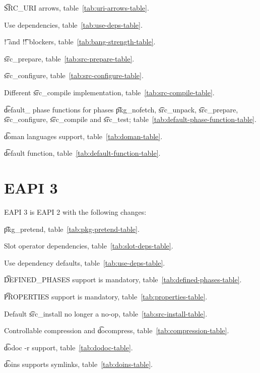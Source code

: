 \begin{compactitem}
\item \t{SRC\_URI} arrows, table~\ref{tab:uri-arrows-table}.
\item Use dependencies, table~\ref{tab:use-deps-table}.
\item \t{!} and \t{!!} blockers, table~\ref{tab:bang-strength-table}.
\item \t{src\_prepare}, table~\ref{tab:src-prepare-table}.
\item \t{src\_configure}, table~\ref{tab:src-configure-table}.
\item Different \t{src\_compile} implementation, table~\ref{tab:src-compile-table}.
\item \t{default\_} phase functions for phases \t{pkg\_nofetch}, \t{src\_unpack}, \t{src\_prepare},
    \t{src\_configure}, \t{src\_compile} and \t{src\_test}; table~\ref{tab:default-phase-function-table}.
\item \t{doman} languages support, table~\ref{tab:doman-table}.
\item \t{default} function, table~\ref{tab:default-function-table}.
\end{compactitem}

\section*{EAPI 3}

EAPI 3 is EAPI 2 with the following changes:

\begin{compactitem}
\item \t{pkg\_pretend}, table~\ref{tab:pkg-pretend-table}.
\item Slot operator dependencies, table~\ref{tab:slot-deps-table}.
\item Use dependency defaults, table~\ref{tab:use-deps-table}.
\item \t{DEFINED\_PHASES} support is mandatory, table~\ref{tab:defined-phases-table}.
\item \t{PROPERTIES} support is mandatory, table~\ref{tab:properties-table}.
\item Default \t{src\_install} no longer a no-op, table~\ref{tab:src-install-table}.
\item Controllable compression and \t{docompress}, table~\ref{tab:compression-table}.
\item \t{dodoc -r} support, table~\ref{tab:dodoc-table}.
\item \t{doins} supports symlinks, table~\ref{tab:doins-table}.
\end{compactitem}


